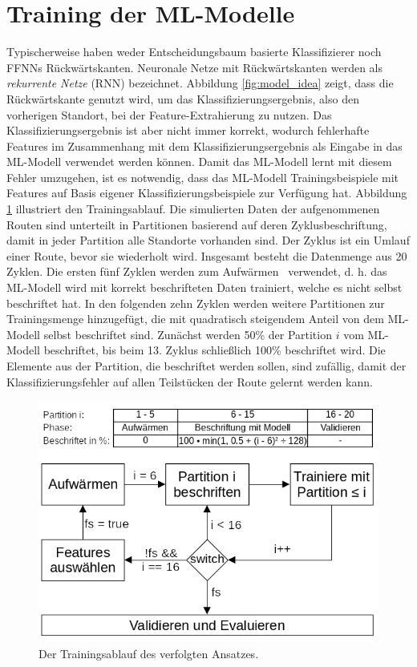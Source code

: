 \section{Training der ML-Modelle}
\label{sec:model_training}
Typischerweise haben weder Entscheidungsbaum basierte Klassifizierer noch FFNNs Rückwärtskanten.
Neuronale Netze mit Rückwärtskanten werden als \textit{rekurrente Netze} (RNN) bezeichnet.
Abbildung \ref{fig:model_idea} zeigt, dass die Rückwärtskante genutzt wird, um das Klassifizierungsergebnis,
also den vorherigen Standort, bei der Feature-Extrahierung zu nutzen.
Das Klassifizierungsergebnis ist aber nicht immer korrekt, wodurch fehlerhafte Features im Zusammenhang
mit dem Klassifizierungsergebnis als Eingabe in das ML-Modell verwendet werden können.
Damit das ML-Modell lernt mit diesem Fehler umzugehen, ist es notwendig, dass das ML-Modell Trainingsbeispiele mit
Features auf Basis eigener Klassifizierungsbeispiele zur Verfügung hat.
\newline
\newline
Abbildung \ref{fig:training_explained} illustriert den Trainingsablauf.
Die simulierten Daten der aufgenommenen Routen sind unterteilt in Partitionen basierend auf deren Zyklusbeschriftung,
damit in jeder Partition alle Standorte vorhanden sind.
Der Zyklus ist ein Umlauf einer Route, bevor sie wiederholt wird.
Insgesamt besteht die Datenmenge aus 20 Zyklen.
Die ersten fünf Zyklen werden zum \glqq Aufwärmen \grqq\ verwendet,
d. h. das ML-Modell wird mit korrekt beschrifteten Daten trainiert, welche es nicht selbst beschriftet hat.
In den folgenden zehn Zyklen werden weitere Partitionen zur Trainingsmenge hinzugefügt, die mit quadratisch steigendem Anteil von dem ML-Modell selbst beschriftet sind.
Zunächst werden 50\% der Partition $i$ vom ML-Modell beschriftet, bis beim 13. Zyklus schließlich 100\% beschriftet wird.
Die Elemente aus der Partition, die beschriftet werden sollen, sind zufällig, damit der Klassifizierungsfehler auf allen Teilstücken der Route gelernt werden kann.
\begin{figure}[h!]
    \centering
    \includegraphics[width=\linewidth]{images/training_explained.png}
    \caption{Der Trainingsablauf des verfolgten Ansatzes.}
    \label{fig:training_explained}
\end{figure}
